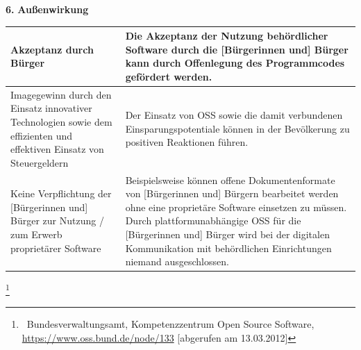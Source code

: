 \documentclass[a4paper]{article}
\newcommand\textstyleInternetlink[1]{\foreignlanguage{english}{\textcolor[rgb]{0.0,0.0,0.5019608}{#1}}}
\newcommand\textstyleACRONYM[1]{#1}
\begin{document}
{
\textbf{6.}\textbf{ }\textbf{Au{\ss}enwirkung}}


\bigskip

\begin{flushleft}
\tablehead{}
\begin{supertabular}{|m{1.8900598in}m{4.77126in}|}
\hline
{} Akzeptanz durch B\"urger &
 Die Akzeptanz der Nutzung beh\"ordlicher
Software durch die [B\"urgerinnen und] B\"urger kann durch Offenlegung
des Programmcodes gef\"ordert werden.\\\hline
{} Imagegewinn durch den Einsatz innovativer
Technologien sowie dem effizienten und effektiven Einsatz von
Steuergeldern &
 Der Einsatz von \textstyleACRONYM{OSS} sowie
die damit verbundenen Einsparungspotentiale k\"onnen in der
Bev\"olkerung zu positiven Reaktionen f\"uhren.\\\hline
{} Keine Verpflichtung der [B\"urgerinnen und]
B\"urger zur Nutzung / zum Erwerb propriet\"arer Software &
 Beispielsweise k\"onnen offene
Dokumentenformate von [B\"urgerinnen und] B\"urgern bearbeitet werden
ohne eine propriet\"are Software einsetzen zu m\"ussen. Durch
plattformunabh\"angige \textstyleACRONYM{OSS} f\"ur die [B\"urgerinnen
und] B\"urger wird bei der digitalen Kommunikation mit beh\"ordlichen
Einrichtungen niemand ausgeschlossen.\\\hline
\end{supertabular}
\end{flushleft}
{
{\guillemotleft}\footnote{\ Bundesverwaltungsamt, Kompetenzzentrum Open
Source Software,
\href{https://www.oss.bund.de/node/133}{\textstyleInternetlink{http}}\href{https://www.oss.bund.de/node/133}{\textstyleInternetlink{\foreignlanguage{ngerman}{s}}}\href{https://www.oss.bund.de/node/133}{\textstyleInternetlink{://www.oss.bund.de/node/133}}\foreignlanguage{english}{
}\foreignlanguage{english}{[abgerufen}\foreignlanguage{english}{
}\foreignlanguage{english}{am}\foreignlanguage{english}{
}\foreignlanguage{english}{13.03.2012]}}}

\end{document}
